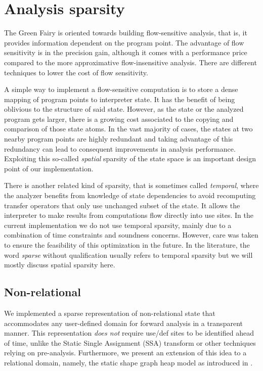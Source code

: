 \documentclass[11pt]{article}
\begin{document}
\section*{Analysis sparsity}

The Green Fairy is oriented towards building flow-sensitive analysis, that is, it provides information dependent on the program point.
The advantage of flow sensitivity is in the precision gain, although it comes with a performance price compared to the more approximative flow-insensitive analysis.
There are different techniques to lower the cost of flow sensitivity.

A simple way to implement a flow-sensitive computation is to store a dense mapping of program points to interpreter state. It has the benefit of being oblivious to the structure of said state.
However, as the state or the analyzed program gets larger, there is a growing cost associated to the copying and comparison of those state atoms.
In the vast majority of cases, the states at two nearby program points are highly redundant and taking advantage of this redundancy can lead to consequent improvements in analysis performance. Exploiting this so-called \emph{spatial} sparsity of the state space is an important design point of our implementation.

There is another related kind of sparsity, that is sometimes called \emph{temporal}, where the analyzer benefits from knowledge of state dependencies to avoid recomputing transfer operators that only use unchanged subset of the state. It allows the interpreter to make results from computations flow directly into use sites.
In the current implementation we do not use temporal sparsity, mainly due to a combination of time constraints and soundness concerns. However, care was taken to ensure the feasibility of this optimization in the future.
In the literature, the word \emph{sparse} without qualification usually refers to temporal sparsity but we will mostly discuss spatial sparsity here.

\subsection*{Non-relational}

We implemented a sparse representation of non-relational state that accommodates any user-defined domain for forward analysis in a transparent manner.
This representation \emph{does not} require use/def sites to be identified ahead of time, unlike the Static Single Assignment (SSA) transform or other techniques relying on pre-analysis\cite{sparse-nr}.
Furthermore, we present an extension of this idea to a relational domain, namely, the static shape graph heap model as introduced in \cite{ssc}.
\end{document}
